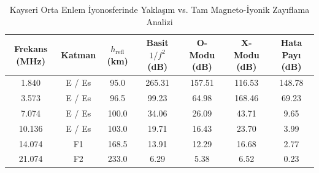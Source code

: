\begin{table}[htbp]
\centering
\caption{Kayseri Orta Enlem İyonosferinde Yaklaşım vs. Tam Magneto-İyonik Zayıflama Analizi}
\begin{tabular}{ccccccc}
\hline
\textbf{Frekans (MHz)} & \textbf{Katman} & \textbf{$h_{\mathrm{refl}}$ (km)} & \textbf{Basit $1/f^2$ (dB)} & \textbf{O-Modu (dB)} & \textbf{X-Modu (dB)} & \textbf{Hata Payı (dB)} \\
\hline
1.840 & E / Es & 95.0 & 265.31 & 157.51 & 116.53 & 148.78 \\
3.573 & E / Es & 96.5 & 99.23 & 64.98 & 168.46 & 69.23 \\
7.074 & E / Es & 100.0 & 34.06 & 26.09 & 43.71 & 9.65 \\
10.136 & E / Es & 103.0 & 19.71 & 16.43 & 23.70 & 3.99 \\
14.074 & F1 & 168.5 & 13.91 & 12.29 & 16.68 & 2.77 \\
21.074 & F2 & 233.0 & 6.29 & 5.38 & 6.52 & 0.23 \\
\hline
\end{tabular}
\end{table}
